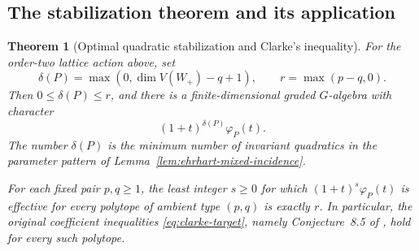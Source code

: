 \documentclass[11pt,a4paper]{article}
\newtheorem{theorem}{Theorem}
\theoremstyle{definition}
\theoremstyle{remark}\newtheorem{remark}[lemma]{Remark}
\begin{document}
\subsection{The stabilization theorem and its application}

\begin{theorem}[Optimal quadratic stabilization and Clarke's inequality]
\label{thm:optimal-ehrhart-stabilization}
For the order-two lattice action above, set
\[
 \delta(P)=\max(0,\dim V(W_+)-q+1),\qquad r=\max(p-q,0).
\]
Then $0\leq\delta(P)\leq r$, and there is a finite-dimensional graded
$G$-algebra with character
\begin{equation}\label{eq:ehrhart-artinian-character}
 (1+t)^{\delta(P)}\varphi_P(t).
\end{equation}
The number $\delta(P)$ is the minimum number of invariant quadratics in
the parameter pattern of Lemma~\ref{lem:ehrhart-mixed-incidence}.

For each fixed pair $p,q\geq1$, the least integer $s\geq0$ for which
$(1+t)^s\varphi_P(t)$ is effective for every polytope of ambient type
$(p,q)$ is exactly $r$. In particular, the original coefficient
inequalities \eqref{eq:clarke-target}, namely Conjecture~8.5 of
\cite{Clarke26}, hold for every such polytope.
\end{theorem}
\end{document}
